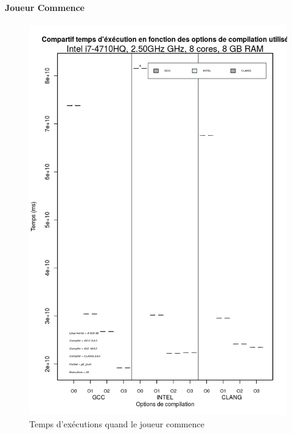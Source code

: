 \documentclass[
 aip,
 jmp,
 amsmath,amssymb,
 reprint
]{revtex4-1}
\begin{document}
\paragraph{Joueur Commence}
\begin{figure}[ht]
  \caption{Temps d'exécutions quand le joueur commence}
  \includegraphics[width=\linewidth, keepaspectratio=true]{GCCvsICCvsCLANG.png}
\end{figure}
\end{document}
